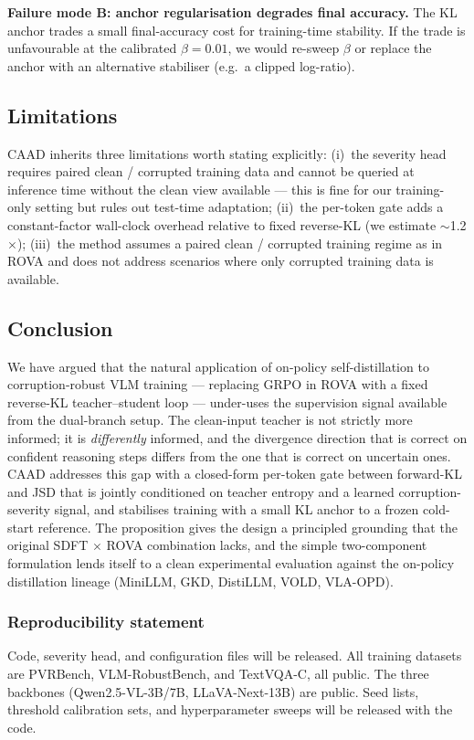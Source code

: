 \documentclass{article}
\newcommand{\caad}{\textsc{CAAD}}
\begin{document}
\textbf{Failure mode B: anchor regularisation degrades final accuracy.} The KL anchor trades a small final-accuracy cost for training-time stability. If the trade is unfavourable at the calibrated $\beta = 0.01$, we would re-sweep $\beta$ or replace the anchor with an alternative stabiliser (e.g.\ a clipped log-ratio).

\subsection{Limitations}

\caad{} inherits three limitations worth stating explicitly: (i)~the severity head requires paired clean / corrupted training data and cannot be queried at inference time without the clean view available --- this is fine for our training-only setting but rules out test-time adaptation; (ii)~the per-token gate adds a constant-factor wall-clock overhead relative to fixed reverse-KL (we estimate $\sim$1.2$\times$); (iii)~the method assumes a paired clean / corrupted training regime as in ROVA and does not address scenarios where only corrupted training data is available.

\subsection{Conclusion}

We have argued that the natural application of on-policy self-distillation to corruption-robust VLM training --- replacing GRPO in ROVA with a fixed reverse-KL teacher--student loop --- under-uses the supervision signal available from the dual-branch setup. The clean-input teacher is not strictly more informed; it is \emph{differently} informed, and the divergence direction that is correct on confident reasoning steps differs from the one that is correct on uncertain ones. \caad{} addresses this gap with a closed-form per-token gate between forward-KL and JSD that is jointly conditioned on teacher entropy and a learned corruption-severity signal, and stabilises training with a small KL anchor to a frozen cold-start reference. The proposition gives the design a principled grounding that the original SDFT $\times$ ROVA combination lacks, and the simple two-component formulation lends itself to a clean experimental evaluation against the on-policy distillation lineage (MiniLLM, GKD, DistiLLM, VOLD, VLA-OPD).

\subsubsection*{Reproducibility statement}
Code, severity head, and configuration files will be released. All training datasets are PVRBench, VLM-RobustBench, and TextVQA-C, all public. The three backbones (Qwen2.5-VL-3B/7B, LLaVA-Next-13B) are public. Seed lists, threshold calibration sets, and hyperparameter sweeps will be released with the code.
\end{document}
